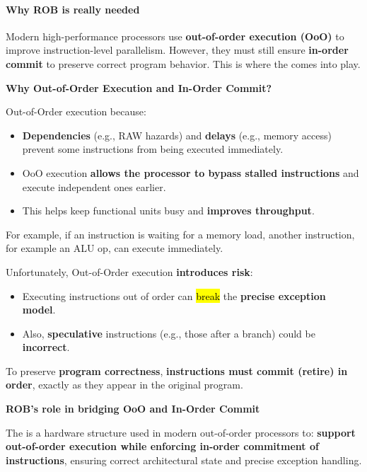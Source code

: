 \paragraph{Why ROB is really needed}

Modern high-performance processors use \textbf{out-of-order execution (OoO)} to improve instruction-level parallelism. However, they must still ensure \textbf{in-order commit} to preserve correct program behavior. This is where the  comes into play.

\highspace
\begin{flushleft}
    \textcolor{Green3}{ \textbf{Why Out-of-Order Execution and In-Order Commit?}}
\end{flushleft}
Out-of-Order execution because:
\begin{itemize}
    \item[\textcolor{Red2}{\faIcon{times}}] \textbf{Dependencies} (e.g., RAW hazards) and \textbf{delays} (e.g., memory access) prevent some instructions from being executed immediately.
    \item[\textcolor{Green3}{\faIcon{check}}] OoO execution \textbf{allows the processor to bypass stalled instructions} and execute independent ones earlier.
    \item[\textcolor{Green3}{\faIcon{\speedIcon}}] This helps keep functional units busy and \textbf{improves throughput}.
\end{itemize}
For example, if an instruction is waiting for a memory load, another instruction, for example an ALU op, can execute immediately.

\highspace
Unfortunately, Out-of-Order execution \textbf{introduces risk}:
\begin{itemize}[label=\textcolor{Red2}{}]
    \item Executing instructions out of order can \hl{break} the \textbf{precise exception model}.
    \item Also, \textbf{speculative} instructions (e.g., those after a branch) could be \textbf{incorrect}.
\end{itemize}
To preserve \textbf{program correctness}, \textbf{instructions must commit (retire) in order}, exactly as they appear in the original program.

\highspace
\begin{flushleft}
    \textcolor{Green3}{ \textbf{ROB's role in bridging OoO and In-Order Commit}}
\end{flushleft}
The  is a hardware structure used in modern out-of-order processors to: \textbf{support out-of-order execution while enforcing in-order commitment of instructions}, ensuring correct architectural state and precise exception handling.

